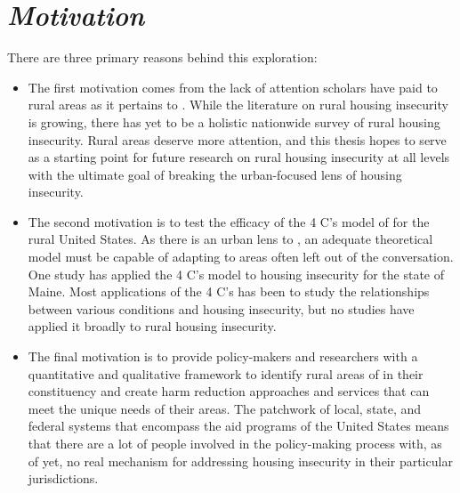 \section{\textit{Motivation}}
There are three primary reasons behind this exploration:
\begin{itemize}
    \item{The first motivation comes from the lack of attention scholars have paid to rural areas as it pertains to \hs. While the literature on rural housing insecurity is growing, there has yet to be a holistic nationwide survey of rural housing insecurity. Rural areas deserve more attention, and this thesis hopes to serve as a starting point for future research on rural housing insecurity at all levels with the ultimate goal of breaking the urban-focused lens of housing insecurity.}
    \item{The second motivation is to test the efficacy of the 4 C's model of \hs for the rural United States. As there is an urban lens to \hs, an adequate theoretical model must be capable of adapting to areas often left out of the conversation. One study \citep{gleason_using_2021} has applied the 4 C's model to housing insecurity for the state of Maine. Most applications of the 4 C's has been to study the relationships between various conditions and housing insecurity, but no studies have applied it broadly to rural housing insecurity.}
    \item{The final motivation is to provide policy-makers and researchers with a quantitative and qualitative framework to identify rural areas of \hs in their constituency and create harm reduction approaches and services that can meet the unique needs of their areas. The patchwork of local, state, and federal systems that encompass the aid programs of the United States means that there are a lot of people involved in the policy-making process with, as of yet, no real mechanism for addressing housing insecurity in their particular jurisdictions.}

\end{itemize}

